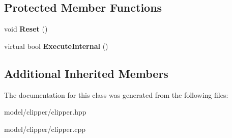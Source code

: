 \subsection*{Protected Member Functions}
\begin{DoxyCompactItemize}
\item 
\hypertarget{classClipperLib_1_1Clipper_a14c704b062e8a079e34a8ce40838861e}{void {\bfseries Reset} ()}\label{classClipperLib_1_1Clipper_a14c704b062e8a079e34a8ce40838861e}

\item 
\hypertarget{classClipperLib_1_1Clipper_a3e8757e5f8a6ffcb7fd0f9630fde02d3}{virtual bool {\bfseries Execute\-Internal} ()}\label{classClipperLib_1_1Clipper_a3e8757e5f8a6ffcb7fd0f9630fde02d3}

\end{DoxyCompactItemize}
\subsection*{Additional Inherited Members}


The documentation for this class was generated from the following files\-:\begin{DoxyCompactItemize}
\item 
model/clipper/clipper.\-hpp\item 
model/clipper/clipper.\-cpp\end{DoxyCompactItemize}

